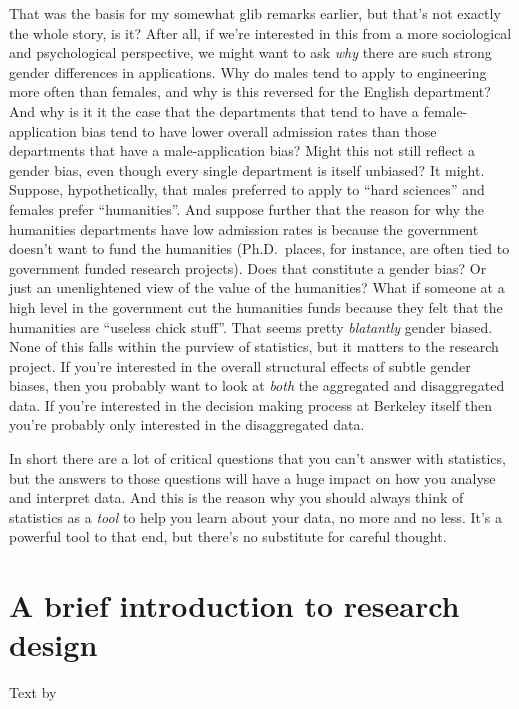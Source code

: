 \documentclass[
]{book}
\begin{document}
That was the basis for my somewhat glib remarks earlier, but that's not exactly the whole story, is it? After all, if we're interested in this from a more sociological and psychological perspective, we might want to ask \emph{why} there are such strong gender differences in applications. Why do males tend to apply to engineering more often than females, and why is this reversed for the English department? And why is it it the case that the departments that tend to have a female-application bias tend to have lower overall admission rates than those departments that have a male-application bias? Might this not still reflect a gender bias, even though every single department is itself unbiased? It might. Suppose, hypothetically, that males preferred to apply to ``hard sciences'' and females prefer ``humanities''. And suppose further that the reason for why the humanities departments have low admission rates is because the government doesn't want to fund the humanities (Ph.D.~places, for instance, are often tied to government funded research projects). Does that constitute a gender bias? Or just an unenlightened view of the value of the humanities? What if someone at a high level in the government cut the humanities funds because they felt that the humanities are ``useless chick stuff''. That seems pretty \emph{blatantly} gender biased. None of this falls within the purview of statistics, but it matters to the research project. If you're interested in the overall structural effects of subtle gender biases, then you probably want to look at \emph{both} the aggregated and disaggregated data. If you're interested in the decision making process at Berkeley itself then you're probably only interested in the disaggregated data.

In short there are a lot of critical questions that you can't answer with statistics, but the answers to those questions will have a huge impact on how you analyse and interpret data. And this is the reason why you should always think of statistics as a \emph{tool} to help you learn about your data, no more and no less. It's a powerful tool to that end, but there's no substitute for careful thought.

\hypertarget{studydesign}{%
\section{A brief introduction to research design}\label{studydesign}}

Text by \citet{Navarro2018}
\end{document}
